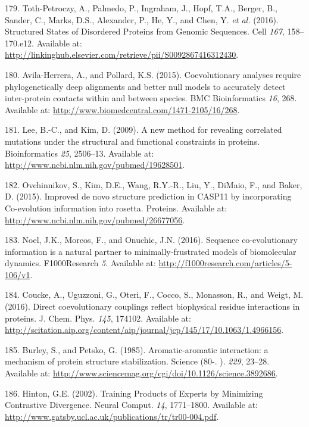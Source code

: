 \documentclass[11pt,a4paper,twoside]{book}
\theoremstyle{definition}
\theoremstyle{definition}
\theoremstyle{remark}
\begin{document}
\hypertarget{ref-Toth-Petroczy2016}{}
179. Toth-Petroczy, A., Palmedo, P., Ingraham, J., Hopf, T.A., Berger,
B., Sander, C., Marks, D.S., Alexander, P., He, Y., and Chen, Y.
\emph{et al.} (2016). Structured States of Disordered Proteins from
Genomic Sequences. Cell \emph{167}, 158--170.e12. Available at:
\url{http://linkinghub.elsevier.com/retrieve/pii/S0092867416312430}.

\hypertarget{ref-Avila-Herrera2015a}{}
180. Avila-Herrera, A., and Pollard, K.S. (2015). Coevolutionary
analyses require phylogenetically deep alignments and better null models
to accurately detect inter-protein contacts within and between species.
BMC Bioinformatics \emph{16}, 268. Available at:
\url{http://www.biomedcentral.com/1471-2105/16/268}.

\hypertarget{ref-Lee2009}{}
181. Lee, B.-C., and Kim, D. (2009). A new method for revealing
correlated mutations under the structural and functional constraints in
proteins. Bioinformatics \emph{25}, 2506--13. Available at:
\url{http://www.ncbi.nlm.nih.gov/pubmed/19628501}.

\hypertarget{ref-Ovchinnikov2015b}{}
182. Ovchinnikov, S., Kim, D.E., Wang, R.Y.-R., Liu, Y., DiMaio, F., and
Baker, D. (2015). Improved de novo structure prediction in CASP11 by
incorporating Co-evolution information into rosetta. Proteins. Available
at: \url{http://www.ncbi.nlm.nih.gov/pubmed/26677056}.

\hypertarget{ref-Noel2016}{}
183. Noel, J.K., Morcos, F., and Onuchic, J.N. (2016). Sequence
co-evolutionary information is a natural partner to minimally-frustrated
models of biomolecular dynamics. F1000Research \emph{5}. Available at:
\url{http://f1000research.com/articles/5-106/v1}.

\hypertarget{ref-Coucke2016}{}
184. Coucke, A., Uguzzoni, G., Oteri, F., Cocco, S., Monasson, R., and
Weigt, M. (2016). Direct coevolutionary couplings reflect biophysical
residue interactions in proteins. J. Chem. Phys. \emph{145}, 174102.
Available at:
\url{http://scitation.aip.org/content/aip/journal/jcp/145/17/10.1063/1.4966156}.

\hypertarget{ref-Burley1985}{}
185. Burley, S., and Petsko, G. (1985). Aromatic-aromatic interaction: a
mechanism of protein structure stabilization. Science (80-. ).
\emph{229}, 23--28. Available at:
\url{http://www.sciencemag.org/cgi/doi/10.1126/science.3892686}.

\hypertarget{ref-Hinton2002}{}
186. Hinton, G.E. (2002). Training Products of Experts by Minimizing
Contrastive Divergence. Neural Comput. \emph{14}, 1771--1800. Available
at: \url{http://www.gatsby.ucl.ac.uk/publications/tr/tr00-004.pdf}.
\end{document}
